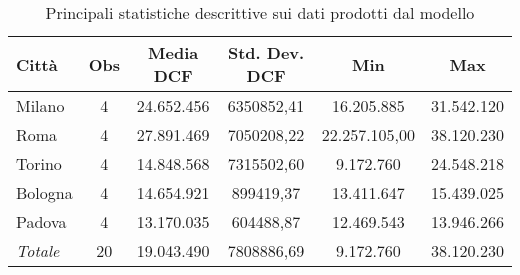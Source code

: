 \begin{table}[htbp]
\label{tab:dcfbasedescrittive}
\begin{center}
\begin{tabular}[c]{|l||*{5}{c|}}
\hline
{\bfseries Città} & {\bfseries Obs} & {\bfseries Media DCF} & {\bfseries Std. Dev.} DCF & {\bfseries Min} & {\bfseries Max} \\
\hline \hline
Milano & 4 & 24.652.456 & 6350852,41 & 16.205.885 & 31.542.120 \\
\hline
Roma & 4 & 27.891.469 & 7050208,22 & 22.257.105,00 & 38.120.230 \\
\hline
Torino & 4 & 14.848.568 & 7315502,60 & 9.172.760 & 24.548.218 \\
\hline
Bologna & 4 & 14.654.921 & 899419,37 & 13.411.647 & 15.439.025 \\
\hline
Padova & 4 & 13.170.035 & 604488,87 & 12.469.543 & 13.946.266 \\
\hline
{\itshape Totale} & 20 & 19.043.490 & 7808886,69 & 9.172.760 & 38.120.230 \\
\hline
\end{tabular}
\caption{Principali statistiche descrittive sui dati prodotti dal modello}
\end{center}
\end{table}